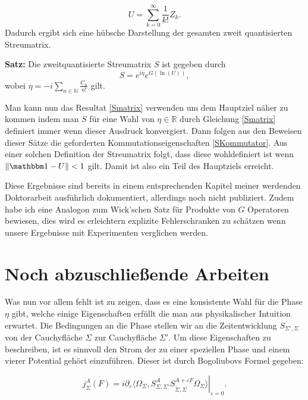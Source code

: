 \documentclass[a4paper,12pt]{article}
\newcommand{\id}{{\mathbbm 1}}
\begin{document}
\begin{equation}
U=\sum_{k=0}^\infty \frac{1}{k!} Z_k.
\end{equation}
Dadurch ergibt sich eine hübsche Darstellung der gesamten zweit quantisierten Streumatrix.

{\bfseries Satz:}
Die zweitquantisierte Streumatrix \(S\) ist gegeben durch
\begin{equation}\label{Smatrix}
S= e^{i \eta} e^{G(\ln (U))},
\end{equation}
wobei \(\eta=-i\sum_{n\in\mathbb{N}}\frac{C_n}{n!}\) gilt.



Man kann nun das Resultat \eqref{Smatrix} verwenden um dem Hauptziel näher zu kommen indem man
\(S\) für eine Wahl von \(\eta\in\mathbb{R}\)
 durch Gleichung \eqref{Smatrix} definiert immer wenn dieser Ausdruck konvergiert.
Dann folgen aus den Beweisen dieser Sätze die geforderten Kommutationseigenschaften
\eqref{SKommutator}. Aus einer solchen Definition der Streumatrix folgt, dass diese
wohldefiniert ist wenn \(\|\id-U\|<1\) gilt. Damit ist also ein Teil des Hauptziels erreicht.

Diese Ergebnisse sind bereits in einem entsprechenden Kapitel meiner werdenden Doktorarbeit
 ausführlich dokumentiert, allerdings noch nicht publiziert.
Zudem habe ich eine Analogon zum Wick'schen Satz für Produkte von \(G\) Operatoren bewiesen, dies
wird es erleichtern explizite Fehlerschranken zu schätzen wenn unsere Ergebnisse mit Experimenten
verglichen werden.



\section{Noch abzuschließende Arbeiten}
Was nun vor allem fehlt ist zu zeigen, dass es eine konsistente Wahl für die Phase \(\eta\) gibt, welche
einige Eigenschaften erfüllt die man aus physikalischer Intuition
erwartet. Die Bedingungen an die Phase
stellen wir an die Zeitentwicklung \(S_{\Sigma',\Sigma}\) von der Cauchyfläche
 \(\Sigma\) zur Cauchyfläche \(\Sigma'\). 
Um diese Eigenschaften zu beschreiben, ist es sinnvoll den Strom der zu einer speziellen Phase
und einem vierer Potential gehört einzuführen. Dieser ist durch Bogoliubovs Formel gegeben:

\begin{equation}
j^A_{\Sigma}(F)=i \partial_\varepsilon \left. \langle \Omega_{\Sigma}, S^A_{\Sigma,\Sigma'} S_{\tilde{\Sigma},\Sigma}^{A+\varepsilon F} \Omega_{\Sigma}\rangle \right|_{\varepsilon=0}.
\end{equation}
\end{document}
